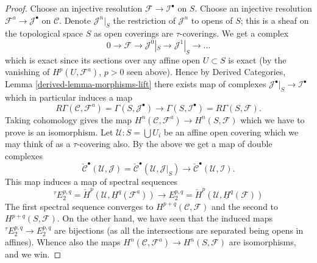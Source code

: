 \documentclass{stacks-project}
\theoremstyle{plain}
\theoremstyle{definition}
\theoremstyle{remark}
\numberwithin{equation}{subsection}
\begin{document}
\begin{proof}
\medskip\noindent
Choose an injective resolution $\mathcal{F} \to \mathcal{I}^\bullet$ on $S$.
Choose an injective resolution $\mathcal{F}^a \to \mathcal{J}^\bullet$
on $\mathcal{C}$. Denote $\mathcal{J}^n|_S$ the restriction of $\mathcal{J}^n$
to opens of $S$; this is a sheaf on the topological space $S$ as open
coverings are $\tau$-coverings. We get a complex
$$
0 \to \mathcal{F} \to \mathcal{J}^0|_S \to \mathcal{J}^1|_S \to \ldots
$$
which is exact since its sections over any affine open $U \subset S$
is exact (by the vanishing of $H^p(U, \mathcal{F}^a)$, $p > 0$ seen
above). Hence by
Derived Categories, Lemma \ref{derived-lemma-morphisms-lift}
there exists map of complexes
$\mathcal{J}^\bullet|_S \to \mathcal{I}^\bullet$ which in particular
induces a map
$$
R\Gamma(\mathcal{C}, \mathcal{F}^a)
=
\Gamma(S, \mathcal{J}^\bullet)
\longrightarrow
\Gamma(S, \mathcal{I}^\bullet)
=
R\Gamma(S, \mathcal{F}).
$$
Taking cohomology gives the map
$H^n(\mathcal{C}, \mathcal{F}^a) \to H^n(S, \mathcal{F})$ which
we have to prove is an isomorphism.
Let $\mathcal{U} : S = \bigcup U_i$ be an affine open covering
which we may think of as a $\tau$-covering also.
By the above we get a map of double complexes
$$
\check{\mathcal{C}}^\bullet(\mathcal{U}, \mathcal{J})
=
\check{\mathcal{C}}^\bullet(\mathcal{U}, \mathcal{J}|_S)
\longrightarrow
\check{\mathcal{C}}^\bullet(\mathcal{U}, \mathcal{I}).
$$
This map induces a map of spectral sequences
$$
{}^\tau\! E_2^{p, q} = \check{H}^p(\mathcal{U}, \underline{H}^q(\mathcal{F}^a))
\longrightarrow
E_2^{p, q} = \check{H}^p(\mathcal{U}, \underline{H}^q(\mathcal{F}))
$$
The first spectral sequence converges to
$H^{p + q}(\mathcal{C}, \mathcal{F})$ and the second to
$H^{p + q}(S, \mathcal{F})$. On the other hand, we have seen
that the induced maps ${}^\tau\! E_2^{p, q} \to E_2^{p, q}$ are
bijections (as all the intersections are separated being opens in affines).
Whence also the maps $H^n(\mathcal{C}, \mathcal{F}^a) \to H^n(S, \mathcal{F})$
are isomorphisms, and we win.
\end{proof}
\end{document}
